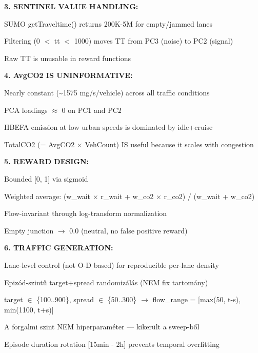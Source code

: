 \documentclass[11pt,a4paper]{article}
\begin{document}
\textbf{3. SENTINEL VALUE HANDLING:}
\par\noindent\hspace*{1em}\textbullet{} SUMO getTraveltime() returns 200K-5M for empty/jammed lanes
\par\noindent\hspace*{1em}\textbullet{} Filtering (0 $<$ tt $<$ 1000) moves TT from PC3 (noise) to PC2 (signal)
\par\noindent\hspace*{1em}\textbullet{} Raw TT is unusable in reward functions

\textbf{4. AvgCO2 IS UNINFORMATIVE:}
\par\noindent\hspace*{1em}\textbullet{} Nearly constant (\textasciitilde{}1575 mg/s/vehicle) across all traffic conditions
\par\noindent\hspace*{1em}\textbullet{} PCA loadings $\approx$ 0 on PC1 and PC2
\par\noindent\hspace*{1em}\textbullet{} HBEFA emission at low urban speeds is dominated by idle+cruise
\par\noindent\hspace*{1em}\textbullet{} TotalCO2 (= AvgCO2 × VehCount) IS useful because it scales with congestion

\textbf{5. REWARD DESIGN:}
\par\noindent\hspace*{1em}\textbullet{} Bounded [0, 1] via sigmoid
\par\noindent\hspace*{1em}\textbullet{} Weighted average: (w\_wait × r\_wait + w\_co2 × r\_co2) / (w\_wait + w\_co2)
\par\noindent\hspace*{1em}\textbullet{} Flow-invariant through log-transform normalization
\par\noindent\hspace*{1em}\textbullet{} Empty junction $\rightarrow$ 0.0 (neutral, no false positive reward)

\textbf{6. TRAFFIC GENERATION:}
\par\noindent\hspace*{1em}\textbullet{} Lane-level control (not O-D based) for reproducible per-lane density
\par\noindent\hspace*{1em}\textbullet{} Epizód-szintű target+spread randomizálás (NEM fix tartomány)
\par\noindent\hspace*{1em}\textbullet{} target $\in$ \{100..900\}, spread $\in$ \{50..300\} $\rightarrow$ flow\_range = [max(50, t-s), min(1100, t+s)]
\par\noindent\hspace*{1em}\textbullet{} A forgalmi szint NEM hiperparaméter — kikerült a sweep-ből
\par\noindent\hspace*{1em}\textbullet{} Episode duration rotation [15min - 2h] prevents temporal overfitting
\end{document}
